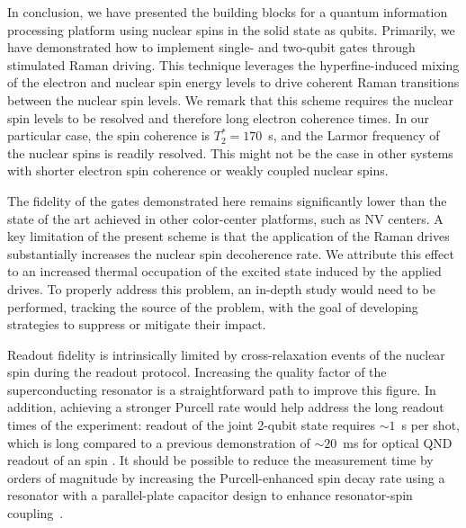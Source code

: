 In conclusion, we have presented the building blocks for a quantum information processing platform using nuclear spins in the solid state as qubits. Primarily, we have demonstrated how to implement single- and two-qubit gates through stimulated Raman driving. This technique leverages the hyperfine-induced mixing of the electron and nuclear spin energy levels to drive coherent Raman transitions between the nuclear spin levels. We remark that this scheme requires the nuclear spin levels to be resolved and therefore long electron coherence times. In our particular case, the \Er spin coherence is $T_2^*=170$~\textmu s, and the Larmor frequency of the nuclear spins is readily resolved. This might not be the case in other systems with shorter electron spin coherence or weakly coupled nuclear spins. %


The fidelity of the gates demonstrated here remains significantly lower than the state of the art achieved in other color-center platforms, such as NV centers. A key limitation of the present scheme is that the application of the Raman drives substantially increases the nuclear spin decoherence rate.  We attribute this effect to an increased thermal occupation of the excited \Er state induced by the applied drives. To properly address this problem, an in-depth study would need to be performed, tracking the source of the problem, with the goal of developing strategies to suppress or mitigate their impact.

Readout fidelity is intrinsically limited by cross-relaxation events of the nuclear spin during the readout protocol. Increasing the quality factor of the superconducting resonator is a straightforward path to improve this figure. In addition, achieving a stronger Purcell rate would help address the long readout times of the experiment: readout of the joint 2-qubit state requires $\sim 1$~s per shot, which is long compared to a previous demonstration of $\sim20$~ms for optical QND readout of an \Er spin . It should be possible to reduce the measurement time by orders of magnitude by increasing the Purcell-enhanced spin decay rate using a resonator with a parallel-plate capacitor design to enhance resonator-spin coupling~. 

